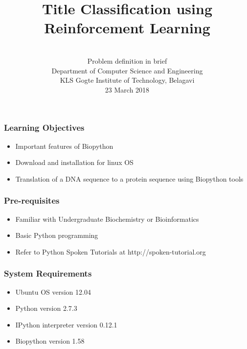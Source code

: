 \documentclass[17pt]{beamer}
\begin{document}
\sffamily \bfseries
 \title
[Mini project in Machine Learning \hspace{0.75cm}]
{Title Classification using Reinforcement Learning}
\author
[ Author Name 1 , Name 2 , Name 3 ]
{%
\small 
      \\ Problem definition in brief       
      \\ [0.2cm] Department of Computer Science and Engineering
      \\ KLS Gogte Institute of Technology, Belagavi
      \\ [0.2cm]
{\small 23 March 2018} \\[0.2cm]
}
\begin{frame}
\titlepage
\end{frame}

\begin{frame}
\frametitle{Learning Objectives} \pause
\begin{itemize}[<+-|alert@+>]
\item Important features of Biopython
\item Download and installation for linux OS
\item Translation of a DNA sequence to a protein sequence using Biopython tools
\end{itemize}
\end{frame}

\begin{frame}
\frametitle{Pre-requisites} \pause
\begin{itemize}[<+-|alert@+>]
\item Familiar with Undergraduate Biochemistry or Bioinformatics
\item Basic Python programming
\item Refer to Python Spoken Tutorials at {\color{blue}http://spoken-tutorial.org} 
\end{itemize}
\end{frame}

\begin{frame}
\frametitle{System Requirements} \pause
\begin{itemize}[<+-|alert@+>]
\item Ubuntu OS version 12.04
\item Python version 2.7.3
\item IPython interpreter version 0.12.1
\item Biopython version 1.58
\end{itemize}
\end{frame}
\end{document}
